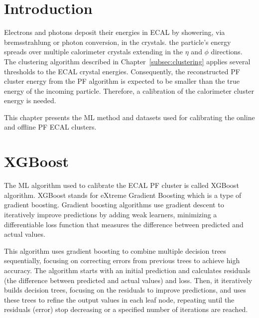 
\section{Introduction}
Electrons and photons deposit their energies in ECAL by showering, via bremsstrahlung or photon conversion, in the crystals.
the particle's energy spreads over multiple calorimeter crystals extending in the $\eta$ and $\phi$ directions.
The clustering algorithm described in Chapter~\ref{subsec:clustering} applies several thresholds to the ECAL crystal energies. Consequently,
the reconstructed PF cluster energy from the PF algorithm is expected to be smaller than the true energy of the incoming particle.
Therefore, a calibration of the calorimeter cluster energy is needed.

This chapter presents the ML method and datasets used for calibrating the online and offline PF ECAL clusters.


\section{XGBoost} %

The ML algorithm used to calibrate the ECAL PF cluster is called XGBoost algorithm.
XGBoost stands for eXtreme Gradient Boosting which is a type of gradient boosting.
Gradient boosting algorithms use gradient descent to iteratively improve predictions by adding weak learners, minimizing a differentiable loss function that measures the difference between predicted and actual values.

This algorithm
uses gradient boosting to combine multiple decision trees sequentially, focusing on correcting errors from previous trees to achieve high accuracy.
The algorithm starts with an initial prediction and calculates residuals (the difference between predicted and actual values) and loss.
Then, it iteratively builds decision trees, focusing on the residuals to improve predictions, and uses these trees to refine the output values in each leaf node, repeating until the residuals (error) stop decreasing or a specified number of iterations are reached.

